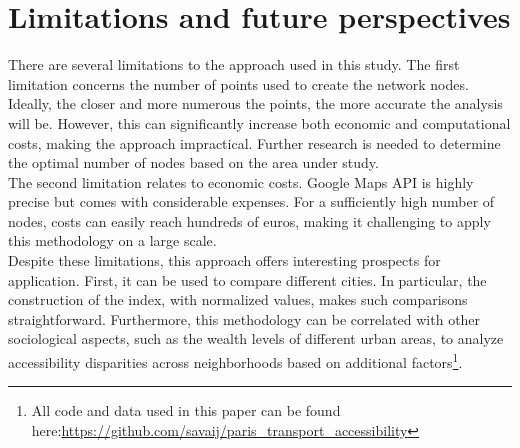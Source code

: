 \documentclass[a4paper,12pt]{article}
\begin{document}
\section{Limitations and future perspectives}
There are several limitations to the approach used in this study. The first limitation concerns the number of points used to create the network nodes. Ideally, the closer and more numerous the points, the more accurate the analysis will be. However, this can significantly increase both economic and computational costs, making the approach impractical. Further research is needed to determine the optimal number of nodes based on the area under study.\\
The second limitation relates to economic costs. Google Maps API is highly precise but comes with considerable expenses. For a sufficiently high number of nodes, costs can easily reach hundreds of euros, making it challenging to apply this methodology on a large scale. \\

Despite these limitations, this approach offers interesting prospects for application. First, it can be used to compare different cities. In particular, the construction of the index, with normalized values, makes such comparisons straightforward. Furthermore, this methodology can be correlated with other sociological aspects, such as the wealth levels of different urban areas, to analyze accessibility disparities across neighborhoods based on additional factors\footnote{All code and data used in this paper can be found here:\url{https://github.com/savaij/paris_transport_accessibility}}.

\newpage

\printbibliography
	
\end{document}
